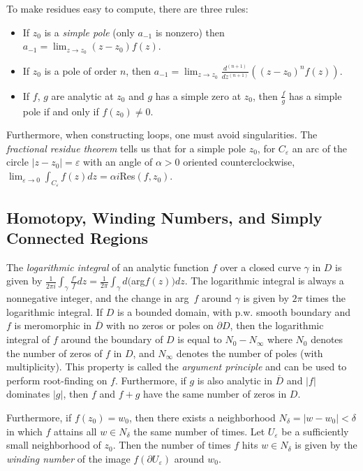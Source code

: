 \documentclass[12pt]{article}
\begin{document}
To make residues easy to compute, there are three rules:
\begin{itemize}
	\item If $z_0$ is a {\it simple pole} (only $a_{-1}$ is nonzero)
		then $a_{-1} = \lim_{z\rightarrow z_0}(z-z_0)f(z)$.
	\item If $z_0$ is a pole of order $n$, then
		$a_{-1}=\lim_{z\rightarrow z_0}\frac{d^{(n+1)}}{dz^{(n+1)}}\left((z-z_0)^n f(z)\right)$.
	\item If $f$, $g$ are analytic at $z_0$ and $g$ has a simple zero
		at $z_0$, then $\frac{f}{g}$ has a simple pole if and
		only if $f(z_0) \neq 0$.
\end{itemize}

Furthermore, when constructing loops, one must avoid singularities.
The {\it fractional residue theorem} tells us that for a simple pole $z_0$,
for $C_\varepsilon$ an arc of the circle $|z - z_0| =\varepsilon$ with
an angle of $\alpha > 0$ oriented counterclockwise, 
$\lim_{\varepsilon\rightarrow 0} \int_{C_\varepsilon} f(z) dz = \alpha i$Res$(f,z_0)$.

\subsection*{Homotopy, Winding Numbers, and Simply Connected Regions}

The {\it logarithmic integral} of an analytic function $f$ over a closed
curve $\gamma$ in $D$ is given by 
$\frac{1}{2\pi i}\int_\gamma \frac{f'}{f} dz = \frac{1}{2\pi}\int_\gamma d($arg$f(z))dz$.
The logarithmic integral is always a nonnegative integer, and the change in
arg~$f$ around $\gamma$ is given by $2\pi$ times the logarithmic integral.
If $D$ is a bounded domain, with p.w. smooth boundary and $f$ is meromorphic
in ${\overline D}$ with no zeros or poles on $\partial D$, then
the logarithmic integral of $f$ around the boundary of $D$ is equal to
$N_0 - N_\infty$ where $N_0$ denotes the number of zeros of $f$ in $D$,
and $N_\infty$ denotes the number of poles (with multiplicity). This
property is called the {\it argument principle} and can be used to perform
root-finding on $f$. Furthermore, if $g$ is also analytic in ${\overline D}$
and $|f|$ dominates $|g|$, then $f$ and $f+g$ have the same number of zeros
in $D$.

Furthermore, if $f(z_0) = w_0$, then there exists a neighborhood
$N_\delta = |w-w_0| < \delta$ in which $f$ attains all $w\in N_\delta$
the same number of times. Let $U_\varepsilon$ be a sufficiently small
neighborhood of $z_0$. Then the number of times $f$ hits $w\in N_\delta$
is given by the {\it winding number} of the image
$f(\partial U_\varepsilon)$ around $w_0$.
\end{document}
